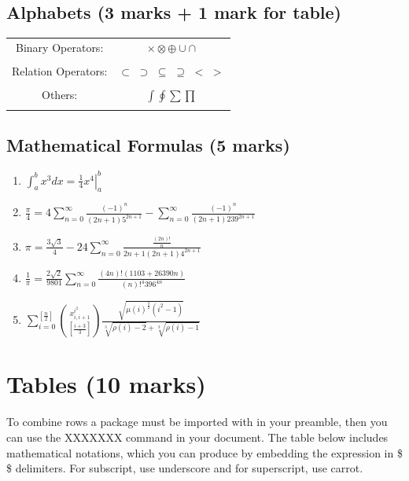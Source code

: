\documentclass[12pt]{article}
\begin{document}
\subsection{Alphabets (3 marks + 1 mark for table)}
\begin{center}
    \begin{tabular}{|c|c|}
    \hline
    Binary Operators: & $\times \otimes \oplus \cup \cap$ \\
    &\\
    \hline
    Relation Operators: & $\subset$ $\supset$ $\subseteq $ $\supseteq $ $<$ $>$ \\
    &\\
    \hline
    Others: & $\int \oint \sum \prod$ \\
    &\\
    \hline
    \end{tabular}{}
\end{center}
\subsection{Mathematical Formulas (5 marks)}
\begin{enumerate}[label=\arabic*.]
\item  $ \displaystyle \int_a^b x^3 dx = \left. \frac{1}{4}x^4 \right |_a^b $

\item $ \displaystyle \frac{\pi}{4} = 4 \sum_{n=0}^{\infty}\frac{(-1)^n}{(2n+1)5^{2n+1}} - \sum_{n=0}^{\infty}\frac{(-1)^n}{(2n+1)239^{2n+1}} $

\item $ \displaystyle \pi = \frac{3\sqrt{3}}{4} - 24\sum_{n=0}^{\infty} \frac{\frac{(2n)!}{n}}{2n+1(2n+1)4^{2n+1}} $

\item $ \displaystyle \frac{1}{\pi} = \frac{2\sqrt{2}}{9801} \sum_{n=0}^\infty \frac{(4n)!(1103+26390n)}{(n)!^4 396^{4n}} $

\item $  \sum_{i=0}^{[\frac{n}{2}]} \binom{{x_{i,i+1}^{i^2}}}  {[\frac{i+3}{3}]} \frac{\sqrt{\mu(i)^\frac{3}{2} (i^2 - 1)}}{\sqrt[3]{\rho(i)-2}+ \sqrt[3]{\rho(i)-1}}$
\end{enumerate}
\pagebreak
\section{Tables (10 marks)}
\noindent
To combine rows a package must be imported with in your preamble, then you can use the XXXXXXX command in your document. The table below includes mathematical notations, which you can produce by embedding the expression in \$ \$ delimiters. For subscript, use underscore and for superscript, use carrot.\\ 
\end{document}
